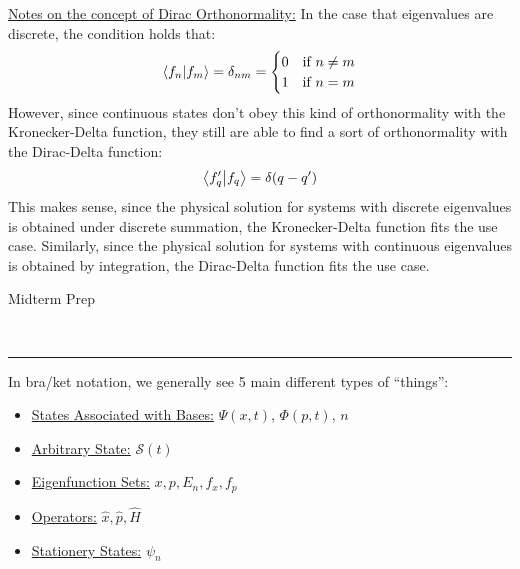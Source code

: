 \documentclass{article}
\newcommand{\header}[1]{\begin{large}\noindent #1\end{large}\\\rule{\textwidth}{0.5pt}}
\newcommand{\sheader}[1]{\underline{#1:}}
\begin{document}
    \sheader{Notes on the concept of Dirac Orthonormality} In the case that eigenvalues are 
    discrete, the condition holds that:
    \begin{align*}
        \braket{f_n}{f_m} = \delta_{nm} = \begin{cases}
            0 & \textrm{if  } n \neq m\\
            1 & \textrm{if  } n = m
        \end{cases}
    \end{align*}
    However, since continuous states don't obey this kind of orthonormality with the Kronecker-Delta 
    function, they still are able to find a sort of orthonormality with the Dirac-Delta function:
    \begin{align*}
        \braket{f_q'}{f_q} = \delta(q - q')
    \end{align*}
    This makes sense, since the physical solution for systems with discrete eigenvalues is obtained under discrete summation,
    the Kronecker-Delta function fits the use case. Similarly, since the physical solution for 
    systems with continuous eigenvalues is obtained by integration, the Dirac-Delta function fits the use case.

    \pagebreak

    \header{Midterm Prep}

    In bra/ket notation, we generally see 5 main different types of ``things'':
    \begin{itemize}
        \item \sheader{States Associated with Bases} $\Psi(x,t)$, $\Phi(p, t)$, $n$
        \item \sheader{Arbitrary State} $\mathcal{S}(t)$
        \item \sheader{Eigenfunction Sets} $x, p, E_n, f_x, f_p$
        \item \sheader{Operators} $\hat{x}, \hat{p}, \hat{H}$
        \item \sheader{Stationery States} $\psi_n$
    \end{itemize}
    
\end{document}
